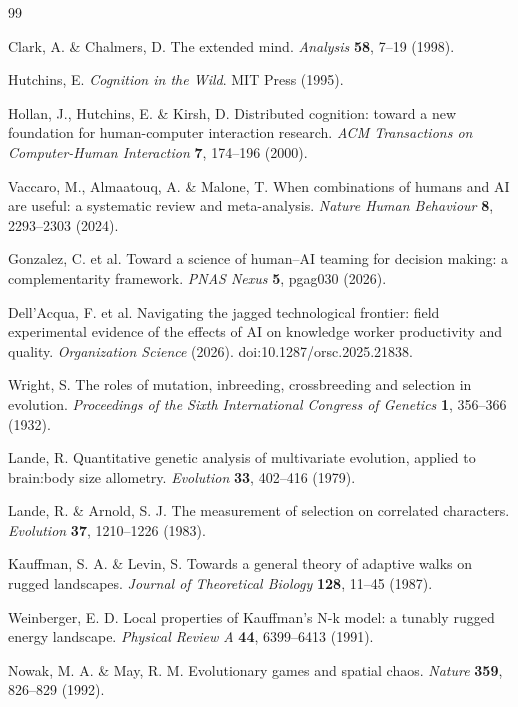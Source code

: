 \documentclass[11pt]{article}
\begin{document}
\clearpage
\begin{thebibliography}{99}

Clark, A. \& Chalmers, D. The extended mind. \textit{Analysis} \textbf{58}, 7--19 (1998).

Hutchins, E. \textit{Cognition in the Wild}. MIT Press (1995).

Hollan, J., Hutchins, E. \& Kirsh, D. Distributed cognition: toward a new foundation for human-computer interaction research. \textit{ACM Transactions on Computer-Human Interaction} \textbf{7}, 174--196 (2000).

Vaccaro, M., Almaatouq, A. \& Malone, T. When combinations of humans and AI are useful: a systematic review and meta-analysis. \textit{Nature Human Behaviour} \textbf{8}, 2293--2303 (2024).

Gonzalez, C. et al. Toward a science of human--AI teaming for decision making: a complementarity framework. \textit{PNAS Nexus} \textbf{5}, pgag030 (2026).

Dell'Acqua, F. et al. Navigating the jagged technological frontier: field experimental evidence of the effects of AI on knowledge worker productivity and quality. \textit{Organization Science} (2026). doi:10.1287/orsc.2025.21838.

Wright, S. The roles of mutation, inbreeding, crossbreeding and selection in evolution. \textit{Proceedings of the Sixth International Congress of Genetics} \textbf{1}, 356--366 (1932).

Lande, R. Quantitative genetic analysis of multivariate evolution, applied to brain:body size allometry. \textit{Evolution} \textbf{33}, 402--416 (1979).

Lande, R. \& Arnold, S. J. The measurement of selection on correlated characters. \textit{Evolution} \textbf{37}, 1210--1226 (1983).

Kauffman, S. A. \& Levin, S. Towards a general theory of adaptive walks on rugged landscapes. \textit{Journal of Theoretical Biology} \textbf{128}, 11--45 (1987).

Weinberger, E. D. Local properties of Kauffman's N-k model: a tunably rugged energy landscape. \textit{Physical Review A} \textbf{44}, 6399--6413 (1991).

Nowak, M. A. \& May, R. M. Evolutionary games and spatial chaos. \textit{Nature} \textbf{359}, 826--829 (1992).


\end{thebibliography}
\end{document}
